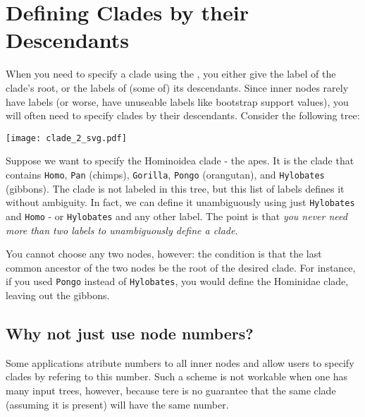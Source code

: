 \chapter{Defining Clades by their Descendants}
\label{sct_def_clades}

When you need to specify a clade using the \nutils{}, you either give the label
of the clade's root, or the labels of (some of) its descendants. Since inner
nodes rarely have labels (or worse, have unuseable labels like bootstrap
support values), you will often need to specify clades by their descendants.
Consider the following tree:

\begin{center}
\texttt{[image: clade\_2\_svg.pdf]} 
\end{center}

\noindent{}Suppose we want to specify the Hominoidea clade - the apes. It is
the clade that contains \texttt{Homo}, \texttt{Pan} (chimps), \texttt{Gorilla},
\texttt{Pongo} (orangutan), and \texttt{Hylobates} (gibbons). The clade is not
labeled in this tree, but this list of labels defines it without ambiguity. In
fact, we can define it unambiguously using just \texttt{Hylobates} and
\texttt{Homo} - or \texttt{Hylobates} and any other label. The point is that
\emph{you never need more than two labels to unambiguously define a clade}.

You cannot choose any two nodes, however: the condition is that the last
common ancestor of the two nodes be the root of the desired clade. For
instance, if you used \texttt{Pongo} instead of \texttt{Hylobates}, you would
define the Hominidae clade, leaving out the gibbons.

\section{Why not just use node numbers?}

Some applications atribute numbers to all inner nodes and allow users to specify clades by refering to this number. Such a scheme is not workable when one has many input trees, however, because tere is no guarantee that the same clade (assuming it is present) will have the same number.
